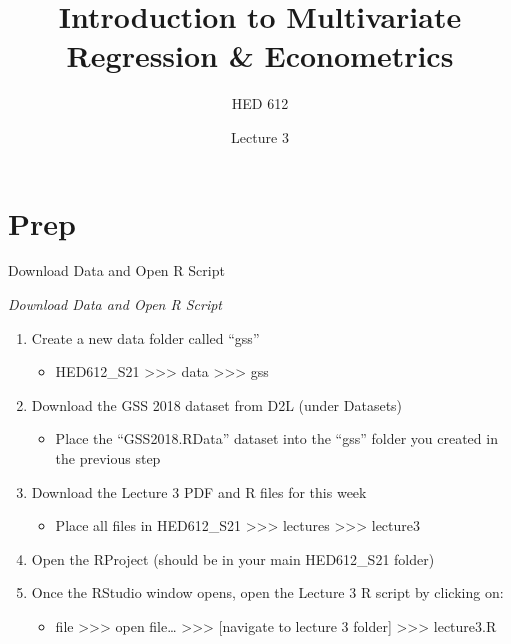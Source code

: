 \documentclass[
  8pt,
  ignorenonframetext,
  dvipsnames]{beamer}
\title{Introduction to Multivariate Regression \& Econometrics}
\subtitle{HED 612}
\author{Lecture 3}
\date{}
\providecommand{\tightlist}{%
  \setlength{\itemsep}{0pt}\setlength{\parskip}{0pt}}
\let\olditem\item
\renewcommand{\item}{%
  \olditem\vspace{4pt}
}
\begin{document}
\frame{\titlepage}

\begin{frame}
  \tableofcontents[hideallsubsections]
\end{frame}
\hypertarget{prep}{%
\section{Prep}\label{prep}}

\begin{frame}{Download Data and Open R Script}
\protect\hypertarget{download-data-and-open-r-script}{}

\emph{Download Data and Open R Script}

\begin{enumerate}
\tightlist
\item
  Create a new data folder called ``gss''

  \begin{itemize}
  \tightlist
  \item
    HED612\_S21 \textgreater\textgreater\textgreater{} data
    \textgreater\textgreater\textgreater{} gss
  \end{itemize}
\item
  Download the GSS 2018 dataset from D2L (under Datasets)

  \begin{itemize}
  \tightlist
  \item
    Place the ``GSS2018.RData'' dataset into the ``gss'' folder you
    created in the previous step
  \end{itemize}
\item
  Download the Lecture 3 PDF and R files for this week

  \begin{itemize}
  \tightlist
  \item
    Place all files in HED612\_S21
    \textgreater\textgreater\textgreater{} lectures
    \textgreater\textgreater\textgreater{} lecture3
  \end{itemize}
\item
  Open the RProject (should be in your main HED612\_S21 folder)
\item
  Once the RStudio window opens, open the Lecture 3 R script by clicking
  on:

  \begin{itemize}
  \tightlist
  \item
    file \textgreater\textgreater\textgreater{} open file\ldots{}
    \textgreater\textgreater\textgreater{} {[}navigate to lecture 3
    folder{]} \textgreater\textgreater\textgreater{} lecture3.R
  \end{itemize}
\end{enumerate}

\end{frame}
\end{document}
